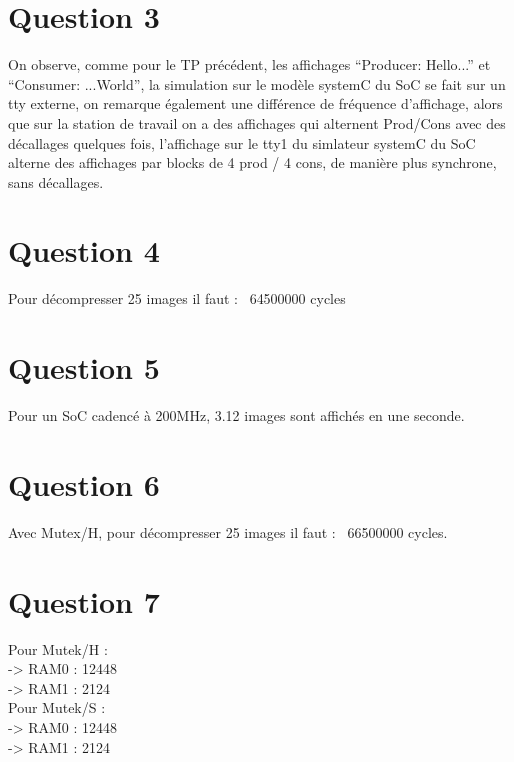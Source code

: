 \documentclass[12pt]{article}
\begin{document}
\section*{Question 3}
On observe, comme pour le TP précédent, les affichages ``Producer: Hello...'' et ``Consumer: ...World'', la simulation sur le modèle systemC du SoC se fait sur un tty externe, on remarque également une différence de fréquence d'affichage, alors que sur la station de travail on a des affichages qui alternent Prod/Cons avec des décallages quelques fois, l'affichage sur le tty1 du simlateur systemC du SoC alterne des affichages par blocks de 4 prod / 4 cons, de manière plus synchrone, sans décallages.

\section*{Question 4}
Pour décompresser 25 images il faut : ~64500000 cycles

\section*{Question 5}
Pour un SoC cadencé à 200MHz, 3.12 images sont affichés en une seconde.

\section*{Question 6}
Avec Mutex/H, pour décompresser 25 images il faut : ~66500000 cycles.

\section*{Question 7}
Pour Mutek/H :\\
-> RAM0 : 12448\\
-> RAM1 : 2124\\
Pour Mutek/S :\\
-> RAM0 : 12448\\
-> RAM1 : 2124\\
\end{document}
